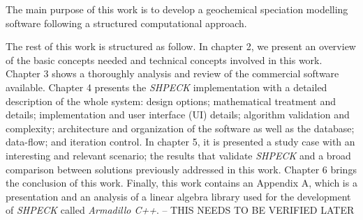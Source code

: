 \documentclass[ppgc,mestrado,english]{iiufrgs}
\begin{document}
The main purpose of this work is to develop a geochemical speciation modelling software following a structured computational approach. 


The rest of this work is structured as follow. In chapter 2, we present an overview of the basic concepts needed and technical concepts involved in this work. Chapter 3 shows a thoroughly analysis and review of the commercial software available. Chapter 4 presents the \emph{SHPECK} implementation with a detailed description of the whole system: design options; mathematical treatment and details; implementation and user interface (UI) details; algorithm validation and complexity; architecture and organization of the software as well as the database; data-flow; and iteration control. In chapter 5, it is presented a study case with an interesting and relevant scenario; the results that validate \emph{SHPECK} and a broad comparison between solutions previously addressed in this work. Chapter 6 brings the conclusion of this work. Finally, this work contains an Appendix A, which is a presentation and an analysis of a linear algebra library used for the development of \emph{SHPECK} called \emph{Armadillo C++}. -- THIS NEEDS TO BE VERIFIED LATER

\newpage
\end{document}
